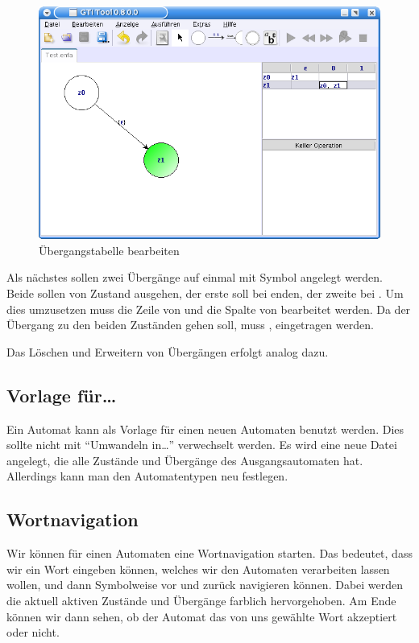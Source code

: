 \begin{figure}[h]
\begin{center}
\includegraphics[width=12cm]{images/machine_table.png}
\caption{Übergangstabelle bearbeiten}
\end{center}
\end{figure}

Als nächstes sollen zwei Übergänge auf einmal mit Symbol  angelegt
werden. Beide sollen von Zustand  ausgehen, der erste soll bei
 enden, der zweite bei . Um dies umzusetzen muss die Zeile
von  und die Spalte von  bearbeitet werden. Da der Übergang
zu den beiden Zuständen gehen soll, muss ,  eingetragen
werden.\vspace{10pt}

Das Löschen und Erweitern von Übergängen erfolgt analog dazu.


\subsection{Vorlage für\ldots}
  
  Ein Automat kann als Vorlage für einen neuen Automaten benutzt werden. Dies
  sollte nicht mit "`Umwandeln in\ldots"' verwechselt werden. Es wird eine neue
  Datei angelegt, die alle Zustände und Übergänge des Ausgangsautomaten hat.
  Allerdings kann man den Automatentypen neu festlegen.
  
\subsection{Wortnavigation}
  
  Wir können für einen Automaten eine Wortnavigation starten. Das bedeutet, dass
  wir ein Wort eingeben können, welches wir den Automaten verarbeiten lassen
  wollen, und dann Symbolweise vor und zurück navigieren können. Dabei werden die
  aktuell aktiven Zustände und Übergänge farblich hervorgehoben. Am Ende können
  wir dann sehen, ob der Automat das von uns gewählte Wort akzeptiert oder
  nicht.\vspace{10pt}
  
